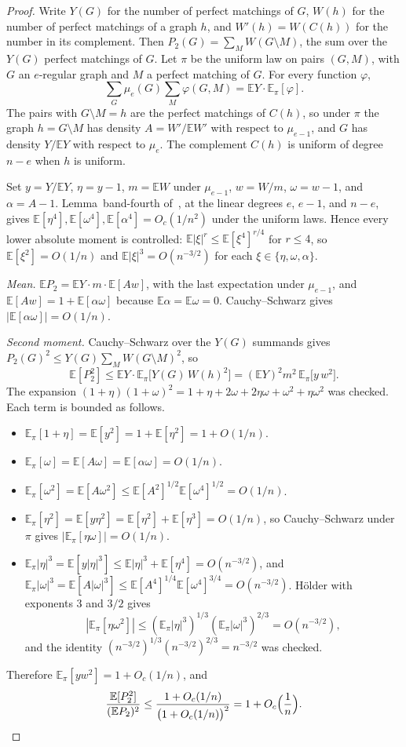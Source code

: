 \documentclass[11pt]{article}
\newcommand{\EE}{\mathbb{E}}
\begin{document}
\begin{proof}
Write \(Y(G)\) for the number of perfect matchings of \(G\), \(W(h)\) for the
number of perfect matchings of a graph \(h\), and \(W'(h)=W(C(h))\) for the
number in its complement.
Then \(P_2(G)=\sum_{M}W(G\setminus M)\), the sum over the \(Y(G)\) perfect
matchings of \(G\).
Let \(\pi\) be the uniform law on pairs \((G,M)\), with \(G\) an \(e\)-regular
graph and \(M\) a perfect matching of \(G\). For every function \(\varphi\),
\[
\sum_G\mu_e(G)\sum_M\varphi(G,M)=\EE Y\cdot\EE_\pi[\varphi].
\]
The pairs with \(G\setminus M=h\) are the perfect matchings of \(C(h)\), so under
\(\pi\) the graph \(h=G\setminus M\) has density \(A=W'/\EE W'\) with respect
to \(\mu_{e-1}\), and \(G\) has density \(Y/\EE Y\) with respect to \(\mu_e\).
The complement \(C(h)\) is uniform of degree \(n-e\) when \(h\) is uniform.

Set \(y=Y/\EE Y\), \(\eta=y-1\), \(m=\EE W\) under \(\mu_{e-1}\),
\(w=W/m\), \(\omega=w-1\), and \(\alpha=A-1\).
Lemma~band-fourth of~\cite{PlusOneV1}, at the linear degrees \(e\), \(e-1\),
and \(n-e\), gives
\(\EE[\eta^4],\EE[\omega^4],\EE[\alpha^4]=O_c(1/n^2)\) under the uniform laws.
Hence every lower absolute moment is controlled:
\(\EE|\xi|^r\le\EE[\xi^4]^{r/4}\) for \(r\le 4\), so \(\EE[\xi^2]=O(1/n)\) and
\(\EE|\xi|^3=O(n^{-3/2})\) for each \(\xi\in\{\eta,\omega,\alpha\}\).

\emph{Mean.}
\(\EE P_2=\EE Y\cdot m\cdot\EE[Aw]\), with the last expectation under
\(\mu_{e-1}\), and \(\EE[Aw]=1+\EE[\alpha\omega]\) because
\(\EE\alpha=\EE\omega=0\).
Cauchy--Schwarz gives \(|\EE[\alpha\omega]|=O(1/n)\).

\emph{Second moment.}
Cauchy--Schwarz over the \(Y(G)\) summands gives
\(P_2(G)^2\le Y(G)\sum_M W(G\setminus M)^2\), so
\[
\EE[P_2^2]
\le
\EE Y\cdot\EE_\pi\bigl[Y(G)\,W(h)^2\bigr]
=
(\EE Y)^2m^2\,\EE_\pi\bigl[y\,w^2\bigr].
\]
The expansion
\((1+\eta)(1+\omega)^2=1+\eta+2\omega+2\eta\omega+\omega^2+\eta\omega^2\)
was checked. Each term is bounded as follows.
\begin{itemize}
\item \(\EE_\pi[1+\eta]=\EE[y^2]=1+\EE[\eta^2]=1+O(1/n)\).
\item \(\EE_\pi[\omega]=\EE[A\omega]=\EE[\alpha\omega]=O(1/n)\).
\item \(\EE_\pi[\omega^2]=\EE[A\omega^2]\le\EE[A^2]^{1/2}\EE[\omega^4]^{1/2}=O(1/n)\).
\item \(\EE_\pi[\eta^2]=\EE[y\eta^2]=\EE[\eta^2]+\EE[\eta^3]=O(1/n)\), so
Cauchy--Schwarz under \(\pi\) gives \(|\EE_\pi[\eta\omega]|=O(1/n)\).
\item \(\EE_\pi|\eta|^3=\EE[y|\eta|^3]\le\EE|\eta|^3+\EE[\eta^4]=O(n^{-3/2})\),
and \(\EE_\pi|\omega|^3=\EE[A|\omega|^3]\le\EE[A^4]^{1/4}\EE[\omega^4]^{3/4}
=O(n^{-3/2})\). Hölder with exponents \(3\) and \(3/2\) gives
\[
|\EE_\pi[\eta\omega^2]|
\le
(\EE_\pi|\eta|^3)^{1/3}(\EE_\pi|\omega|^3)^{2/3}
=O(n^{-3/2}),
\]
and the identity
\((n^{-3/2})^{1/3}(n^{-3/2})^{2/3}=n^{-3/2}\) was checked.
\end{itemize}
Therefore \(\EE_\pi[yw^2]=1+O_c(1/n)\), and
\[
\frac{\EE[P_2^2]}{(\EE P_2)^2}
\le
\frac{1+O_c(1/n)}{\bigl(1+O_c(1/n)\bigr)^2}
=
1+O_c\Bigl(\frac1n\Bigr).
\]
\end{proof}
\end{document}
